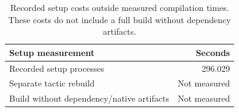 \begin{table}[!htbp]\centering\small
\caption{Recorded setup costs outside measured compilation times. These costs do not include a full build without dependency artifacts.}
\begin{tabular}{lr}\toprule
Setup measurement & Seconds\\\midrule
Recorded setup processes & 296.029\\
Separate tactic rebuild & Not measured\\
Build without dependency/native artifacts & Not measured\\
\bottomrule\end{tabular}\end{table}

